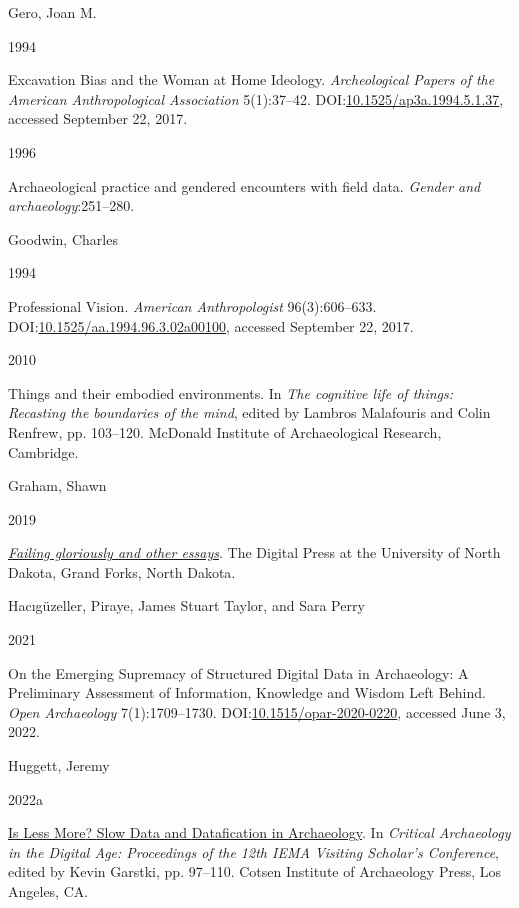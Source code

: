 \documentclass[
]{article}
\newlength{\cslhangindent}
\newlength{\csllabelwidth}
\newenvironment{CSLReferences}[2] %
 {\begin{list}{}{%
  \setlength{\itemindent}{0pt}
  \setlength{\leftmargin}{0pt}
  \setlength{\parsep}{0pt}
  \ifodd #1
   \setlength{\leftmargin}{\cslhangindent}
   \setlength{\itemindent}{-1\cslhangindent}
  \fi
  \setlength{\itemsep}{#2\baselineskip}}}
 {\end{list}}
\newcommand{\CSLBlock}[1]{\hfill\break\parbox[t]{\linewidth}{\strut\ignorespaces#1\strut}}
\newcommand{\CSLLeftMargin}[1]{\parbox[t]{\csllabelwidth}{\strut#1\strut}}
\newcommand{\CSLRightInline}[1]{\parbox[t]{\linewidth - \csllabelwidth}{\strut#1\strut}}
\begin{document}
\begin{CSLReferences}{0}{1}
\CSLBlock{Gero, Joan M.}
\CSLLeftMargin{ 1994}%
\CSLRightInline{Excavation {Bias} and the {Woman} at {Home Ideology}.
\emph{Archeological Papers of the American Anthropological Association}
5(1):37--42.
DOI:\href{https://doi.org/10.1525/ap3a.1994.5.1.37}{10.1525/ap3a.1994.5.1.37},
accessed September 22, 2017.}

\CSLLeftMargin{ 1996 }%
\CSLRightInline{Archaeological practice and gendered encounters with
field data. \emph{Gender and archaeology}:251--280.}

\CSLBlock{Goodwin, Charles}
\CSLLeftMargin{ 1994}%
\CSLRightInline{Professional {Vision}. \emph{American Anthropologist}
96(3):606--633.
DOI:\href{https://doi.org/10.1525/aa.1994.96.3.02a00100}{10.1525/aa.1994.96.3.02a00100},
accessed September 22, 2017.}

\CSLLeftMargin{ 2010 }%
\CSLRightInline{Things and their embodied environments. In \emph{The
cognitive life of things: {Recasting} the boundaries of the mind},
edited by Lambros Malafouris and Colin Renfrew, pp. 103--120. McDonald
Institute of Archaeological Research, Cambridge.}

\CSLBlock{Graham, Shawn}
\CSLLeftMargin{ 2019}%
\CSLRightInline{\emph{\href{https://doi.org/10.31356/dpb015}{Failing
gloriously and other essays}}. The Digital Press at the University of
North Dakota, Grand Forks, North Dakota.}

\CSLBlock{Hacıgüzeller, Piraye, James Stuart Taylor, and Sara Perry}
\CSLLeftMargin{ 2021}%
\CSLRightInline{On the {Emerging Supremacy} of {Structured Digital Data}
in {Archaeology}: {A Preliminary Assessment} of {Information},
{Knowledge} and {Wisdom Left Behind}. \emph{Open Archaeology}
7(1):1709--1730.
DOI:\href{https://doi.org/10.1515/opar-2020-0220}{10.1515/opar-2020-0220},
accessed June 3, 2022.}

\CSLBlock{Huggett, Jeremy}
\CSLLeftMargin{ 2022a}%
\CSLRightInline{\href{https://escholarship.org/uc/item/0vh9t9jq\#page=112}{Is
{Less More}? {Slow Data} and {Datafication} in {Archaeology}}. In
\emph{Critical {Archaeology} in the {Digital Age}: {Proceedings} of the
12th {IEMA Visiting Scholar}'s {Conference}}, edited by Kevin Garstki,
pp. 97--110. Cotsen Institute of Archaeology Press, Los Angeles, CA.}


\end{CSLReferences}
\end{document}
